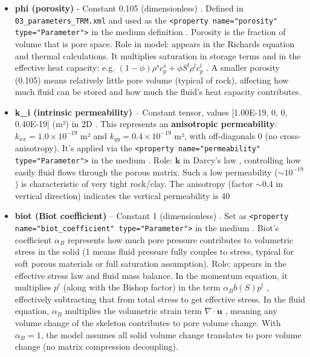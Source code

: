\documentclass[10pt,a4paper]{article}
\begin{document}
\begin{itemize}
    \item \textbf{phi (porosity)} - Constant 0.105 (dimensionless) \cite{file:03_parameters_TRM}. Defined in \texttt{03\_parameters\_TRM.xml} and used as the \texttt{<property name="porosity" type="Parameter">} in the medium definition \cite{file:04_media_TRM}. Porosity is the fraction of volume that is pore space. Role in model: appears in the Richards equation and thermal calculations. It multiplies saturation in storage terms and in the effective heat capacity: e.g. $(1-\phi)\rho^s c_p^s + \phi S^l \rho^l c_p^l$ \cite{ogs:trm}. A smaller porosity (0.105) means relatively little pore volume (typical of rock), affecting how much fluid can be stored and how much the fluid's heat capacity contributes.

    \item \textbf{k\_i (intrinsic permeability)} – Constant tensor, values [1.00E-19, 0, 0, 0.40E-19] (m²) in 2D \cite{file:03_parameters_TRM}. This represents an \textbf{anisotropic permeability}: $k_{xx}=1.0\times10^{-19}$ m² and $k_{yy}=0.4\times10^{-19}$ m², with off-diagonals 0 (no cross-anisotropy). It's applied via the \texttt{<property name="permeability" type="Parameter">} in the medium \cite{file:04_media_TRM}. Role: $\mathbf{k}$ in Darcy's law \cite{ogs:trm}, controlling how easily fluid flows through the porous matrix. Such a low permeability ($\sim 10^{-19}$) is characteristic of very tight rock/clay. The anisotropy (factor $\sim$0.4 in vertical direction) indicates the vertical permeability is 40%

    \item \textbf{biot (Biot coefficient)} – Constant 1 (dimensionless) \cite{file:03_parameters_TRM}. Set as \texttt{<property name="biot\_coefficient" type="Parameter">} in the medium \cite{file:04_media_TRM}. Biot's coefficient $\alpha_B$ represents how much pore pressure contributes to volumetric stress in the solid (1 means fluid pressure fully couples to stress, typical for soft porous materials or full saturation assumption). Role: appears in the effective stress law and fluid mass balance. In the momentum equation, it multiplies $p^l$ (along with the Bishop factor) in the term $\alpha_B b(S) p^l$ \cite{ogs:trm, doc:trm_gov_eq}, effectively subtracting that from total stress to get effective stress. In the fluid equation, $\alpha_B$ multiplies the volumetric strain term $\nabla\cdot \dot{\mathbf{u}}$ \cite{ogs:trm}, meaning any volume change of the skeleton contributes to pore volume change. With $\alpha_B=1$, the model assumes all solid volume change translates to pore volume change (no matrix compression decoupling).


\end{itemize}
\end{document}
